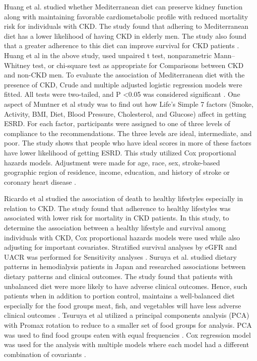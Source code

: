 \noindent Huang et al. \cite{Huangetal2013} studied whether Mediterranean diet can preserve kidney function along with maintaining favorable cardiometabolic profile with reduced mortality risk for individuals with CKD. The study found that adhering to Mediterranean diet has a lower likelihood of having CKD in elderly men. The study also found that a greater adherence to this diet can improve survival for CKD patients \cite{Huangetal2013}. Huang et al \cite{Huangetal2013} in the above study, used unpaired t test, nonparametric Mann–Whitney test, or chi-square test as appropriate for Comparisons between CKD and non-CKD men. To evaluate the association of Mediterranean diet with the presence of CKD, Crude and multiple adjusted logistic regression models were fitted. All tests were two-tailed, and P \textless 0.05 was considered significant \cite{Huangetal2013}. One aspect of Muntner et al \cite{Muntneretal2013} study was to find out how Life’s Simple 7 factors (Smoke, Activity, BMI, Diet, Blood Pressure, Cholesterol, and Glucose) affect in getting ESRD. For each factor, participants were assigned to one of  three levels of compliance to the recommendations. The three levels are ideal, intermediate, and poor. The study shows that people who have ideal scores in more of these factors have lower likelihood of getting ESRD. This study utilized Cox proportional hazards models. Adjustment were made for age, race, sex, stroke-based geographic region of residence, income, education, and history of stroke or coronary heart disease \cite{Muntneretal2013}.

\noindent  Ricardo et al \cite{Ricardoetal2013} studied the association of death to healthy lifestyles especially in relation to CKD. The study found that adherence to healthy lifestyles was associated with lower risk for mortality in CKD patients. In this study, to determine the association between a healthy lifestyle and survival among individuals with CKD, Cox proportional hazards models were used while also adjusting for important covariates. Stratified survival analyses by eGFR and UACR was performed for Sensitivity analyses \cite{Ricardoetal2013}. Suruya et al. \cite{Tsuruyaetal2015} studied dietary patterns in hemodialysis patients in Japan and researched associations between dietary patterns and clinical outcomes. The study found that patients with unbalanced diet were more likely to have adverse clinical outcomes. Hence, such patients when in addition to portion control, maintains a well-balanced diet especially for the food groups meat, fish, and vegetables will have less adverse clinical outcomes \cite{Tsuruyaetal2015}. Tsuruya et al \cite{Tsuruyaetal2015} utilized a principal components analysis (PCA) with Promax rotation to reduce to a smaller set of food groups for analysis. PCA was used to find food groups eaten with equal frequencies \cite{Tsuruyaetal2015}. Cox regression model was used for the analysis with multiple models where each model had a different combination of covariants \cite{Tsuruyaetal2015}.

